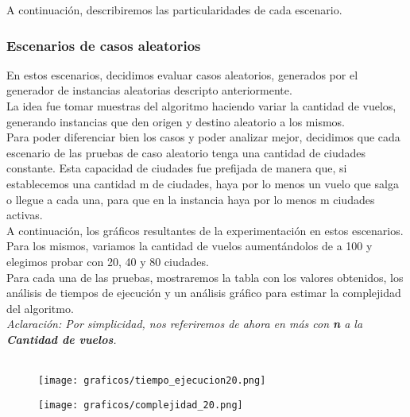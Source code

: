 \noindent A continuación, describiremos las particularidades de cada escenario.


\subsubsection{Escenarios de casos aleatorios}

\noindent En estos escenarios, decidimos evaluar casos aleatorios, generados por el generador de instancias aleatorias descripto anteriormente.\\

\noindent La idea fue tomar muestras del algoritmo haciendo variar la cantidad de vuelos, generando instancias que den origen y destino aleatorio a los mismos.\\

\noindent Para poder diferenciar bien los casos y poder analizar mejor, decidimos que cada escenario de las pruebas de caso aleatorio tenga una cantidad de ciudades constante. Esta capacidad de ciudades fue prefijada de manera que, si establecemos una cantidad m de ciudades, haya por lo menos un vuelo que salga o llegue a cada una, para que en la instancia haya por lo menos m ciudades activas.\\

\noindent A continuación, los gráficos resultantes de la experimentación en estos escenarios. Para los mismos, variamos la cantidad de vuelos aumentándolos de a 100 y elegimos probar con 20, 40 y 80 ciudades.\\

\noindent Para cada una de las pruebas, mostraremos la tabla con los valores obtenidos, los análisis de tiempos de ejecución y un análisis gráfico para estimar la complejidad del algoritmo.\\

\noindent \textit{Aclaración: Por simplicidad, nos referiremos de ahora en más con \textbf{n} a la \textbf{Cantidad de vuelos}. \\\\
}
	\begin{figure}[h]
		\begin{center}
		   \texttt{[image: graficos/tiempo\_ejecucion20.png]}
		\end{center}
	\end{figure}

\newpage
	\begin{figure}[h]
		\begin{center}
		   \texttt{[image: graficos/complejidad\_20.png]}
		\end{center}
	\end{figure}



